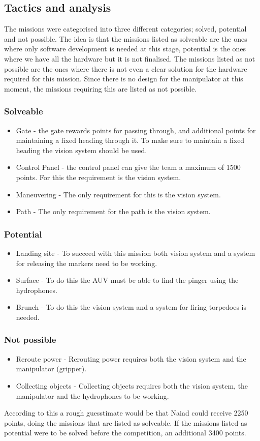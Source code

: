 	\subsection{Tactics and analysis}
\noindent
The missions were categorised into three different categories; solved, potential and not possible. The idea is that the missions listed as solveable are the ones where only software development is needed at this stage, potential is the ones where we have all the hardware but it is not finalised. The missions listed as not possible are the ones where there is not even a clear solution for the hardware required for this mission. Since there is no design for the manipulator at this moment, the missions requiring this are listed as not possible. 
\subsubsection*{Solveable}
\begin{itemize}
\item Gate - the gate rewards points for passing through, and additional points for maintaining a fixed heading through it. To make sure to maintain a fixed heading the vision system should be used. 
\item Control Panel - the control panel can give the team a maximum of 1500 points. For this the requirement is the vision system. 
\item Maneuvering - The only requirement for this is the vision system. 
\item Path - The only requirement for the path is the vision system. 
\end{itemize}
\subsubsection*{Potential}
\begin{itemize}
\item Landing site - To succeed with this mission both vision system and a system for releasing the markers need to be working. 
\item Surface - To do this the AUV must be able to find the pinger using the hydrophones. 
\item Brunch - To do this the vision system and a system for firing torpedoes is needed. 
\end{itemize}
\subsubsection*{Not possible}
\begin{itemize}
\item Reroute power - Rerouting power requires both the vision system and the manipulator (gripper).  
\item Collecting objects - Collecting objects requires both the vision system, the manipulator and the hydrophones to be working. 
\end{itemize}

According to this a rough guesstimate would be that Naiad could receive 2250 points, doing the missions that are listed as solveable. If the missions listed as potential were to be solved before the competition, an additional 3400 points.